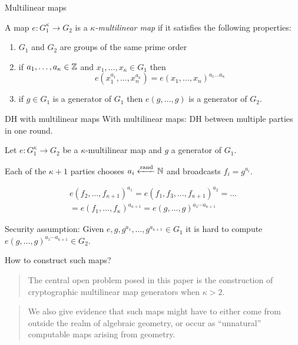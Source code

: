 \documentclass[english]{beamer}
\begin{document}
    \begin{frame}{Multilinear maps}
        \begin{definition}
            A map $e: G_1^\kappa \rightarrow G_2$ is a \emph{$\kappa$-multilinear map} if it satisfies the following properties:
            \begin{enumerate}
                \item $G_1$ and $G_2$ are groups of the same prime order
                \item if $a_1,\dots ,a_\kappa \in \mathbb{Z}$ and $x_1, \dots, x_\kappa \in G_1$ then
                    \begin{equation*}
                        e\left( x_1^{a_1}, \dots, x_n^{a_\kappa} \right) = e(x_1, \dots, x_n)^{a_1\dots a_\kappa}
                    \end{equation*}
                \item if $g \in G_1$ is a generator of $G_1$ then $e(g, \dots, g)$ is a generator of $G_2$.
            \end{enumerate}
        \end{definition}
    \end{frame}
    \begin{frame}{DH with multilinear maps}
        With multilinear maps: DH between multiple parties in one round.
        \pause

        Let $e: G_1^\kappa \rightarrow G_2$ be a $\kappa$-multilinear map and $g$ a generator of $G_1$.

        Each of the $\kappa+1$ parties chooses $a_i \xleftarrow{\mathrm{rand}} \mathbb{N}$ and broadcasts $f_i = g^{a_i}$.

        \begin{multline*}
            e(f_2, \dots, f_{\kappa+1})^{a_1} = e(f_1, f_3, \dots, f_{\kappa+1})^{a_2} = \dots \\
            = e(f_1, \dots, f_\kappa)^{a_{\kappa+1}} = e(g, \dots, g)^{a_1 \cdots a_{\kappa+1}}
        \end{multline*}

        \pause
        Security assumption: Given $e, g, g^{a_1}, \dots, g^{a_{\kappa+1}} \in G_1$ it is hard to compute $e(g, \dots, g)^{a_1 \cdots a_{\kappa+1}} \in G_2$.
    \end{frame}
    \begin{frame}{How to construct such maps?}
        \blockquote[][]{The central open problem posed in this paper is the construction of cryptographic multilinear map generators when $\kappa > 2$.}
        \pause

        \blockquote[][]{We also give evidence that such maps might have to either come from outside the realm of algebraic geometry, or occur as \enquote{unnatural} computable maps arising from geometry.}
    \end{frame}
\end{document}
